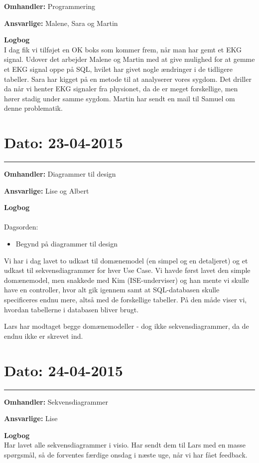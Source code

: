 \textbf{Omhandler:} Programmering

\textbf{Ansvarlige:} Malene, Sara og Martin

\textbf{Logbog}
\\
I dag fik vi tilføjet en OK boks som kommer frem, når man har gemt et EKG signal. Udover det arbejder Malene og Martin med at give mulighed for at gemme et EKG signal oppe på SQL, hvilet har givet nogle ændringer i de tidligere tabeller. Sara har kigget på en metode til at analyserer vores sygdom. Det driller da når vi henter EKG signaler fra physionet, da de er meget forskellige, men hører stadig under samme sygdom. Martin har sendt en mail til Samuel om denne problematik.

\section{Dato: 23-04-2015}
\hrule 

\textbf{Omhandler:} Diagrammer til design

\textbf{Ansvarlige:} Lise og Albert 

\textbf{Logbog}
\\
\\
Dagsorden:
\begin{itemize}
	\item Begynd på diagrammer til design
\end{itemize}

Vi har i dag lavet to udkast til domænemodel (en simpel og en detaljeret) og et udkast til sekvensdiagrammer for hver Use Case. Vi havde først lavet den simple domænemodel, men snakkede med Kim (ISE-underviser) og han mente vi skulle have en controller, hvor alt gik igennem samt at SQL-databasen skulle specificeres endnu mere, altså med de forskellige tabeller. På den måde viser vi, hvordan tabellerne i databasen bliver brugt. 


Lars har modtaget begge domænemodeller - dog ikke sekvensdiagrammer, da de endnu ikke er skrevet ind.


\section{Dato: 24-04-2015}
\hrule

\textbf{Omhandler:} Sekvensdiagrammer

\textbf{Ansvarlige:} Lise

\textbf{Logbog}
\\
Har lavet alle sekvensdiagrammer i visio. Har sendt dem til Lars med en masse spørgsmål, så de forventes færdige onsdag i næste uge, når vi har fået feedback. 

